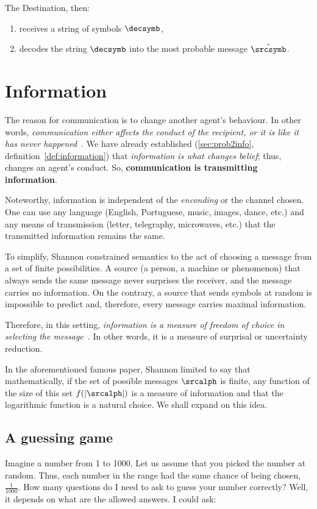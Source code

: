 The Destination, then:
\begin{enumerate}
	\item receives a string of symbols \(\decsymb\),
	\item decodes the string \(\decsymb\) into the most probable message \(\hat{\srcsymb}\).
\end{enumerate}

\section{Information} The reason for communication is to change another agent's behaviour. In other words, \emph{communication either affects the conduct of the recipient, or it is like it has never happened}~\cite[p.100]{shannon:1948}. We have already established (\cref{sec:prob2info}, definition~\ref{def:information}) that \emph{information is what changes belief}; thus, changes an agent's conduct. So, \textbf{communication is transmitting information}.

Noteworthy, information is independent of the \emph{enconding} or the channel chosen. One can use any language (English, Portuguese, music, images, dance, etc.) and any means of transmission (letter, telegraphy, microwaves, etc.) that the transmitted information remains the same.

To simplify, Shannon constrained semantics to the act of choosing a message from a set of finite possibilities. A source (a person, a machine or phenomenon) that always sends the same message never surprises the receiver, and the message carries no information. On the contrary, a source that sends symbols at random is impossible to predict and, therefore, every message carries maximal information.

Therefore, in this setting, \emph{information is a measure of freedom of choice in selecting the message}~\cite[p.100]{shannon:1949}. In other words, it is a measure of surprisal or uncertainty reduction.

In the aforementioned famous paper, Shannon limited to say that mathematically, if the set of possible messages \(\srcalph\)  is finite, any function of the size of this set \(f(|\srcalph|)\) is a measure of information and that the logarithmic function is a natural choice. We shall expand on this idea.

\subsection{A guessing game}\label{guessing_game} Imagine a number from 1 to 1000. Let us assume that you picked the number at random. Thus, each number in the range had the same chance of being chosen, \(\frac{1}{1000}\). How many questions do I need to ask to guess your number correctly? Well, it depends on what are the allowed answers. I could ask:


